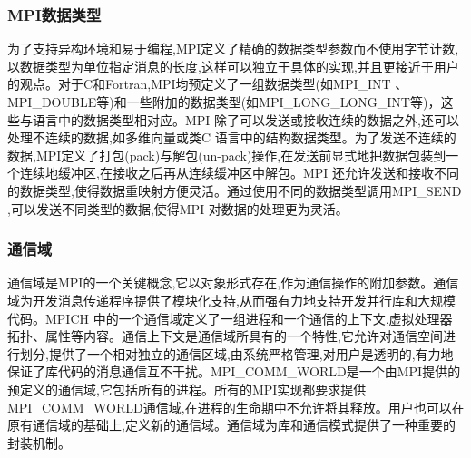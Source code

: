 \documentclass[paper=a4]{ctexart} %
\numberwithin{equation}{section} %
\numberwithin{figure}{section} %
\numberwithin{table}{section} %
\begin{document}
\subsubsection{MPI数据类型}
为了支持异构环境和易于编程,MPI定义了精确的数据类型参数而不使用字节计数,以数据类型为单位指定消息的长度,这样可以独立于具体的实现,并且更接近于用户的观点。对于C和Fortran,MPI均预定义了一组数据类型(如MPI\_INT 、MPI\_DOUBLE等)和一些附加的数据类型(如MPI\_LONG\_LONG\_INT等)，这些与语言中的数据类型相对应。MPI 除了可以发送或接收连续的数据之外,还可以处理不连续的数据,如多维向量或类C 语言中的结构数据类型。为了发送不连续的数据,MPI定义了打包(pack)与解包(un-pack)操作,在发送前显式地把数据包装到一个连续地缓冲区,在接收之后再从连续缓冲区中解包。MPI 还允许发送和接收不同的数据类型,使得数据重映射方便灵活。通过使用不同的数据类型调用MPI\_SEND ,可以发送不同类型的数据,使得MPI 对数据的处理更为灵活。

\subsubsection{通信域}
通信域是MPI的一个关键概念,它以对象形式存在,作为通信操作的附加参数。通信域为开发消息传递程序提供了模块化支持,从而强有力地支持开发并行库和大规模代码。MPICH 中的一个通信域定义了一组进程和一个通信的上下文,虚拟处理器拓扑、属性等内容。通信上下文是通信域所具有的一个特性,它允许对通信空间进行划分,提供了一个相对独立的通信区域,由系统严格管理,对用户是透明的,有力地保证了库代码的消息通信互不干扰。MPI\_COMM\_WORLD是一个由MPI提供的预定义的通信域,它包括所有的进程。所有的MPI实现都要求提供MPI\_COMM\_WORLD通信域,在进程的生命期中不允许将其释放。用户也可以在原有通信域的基础上,定义新的通信域。通信域为库和通信模式提供了一种重要的封装机制。
\end{document}
